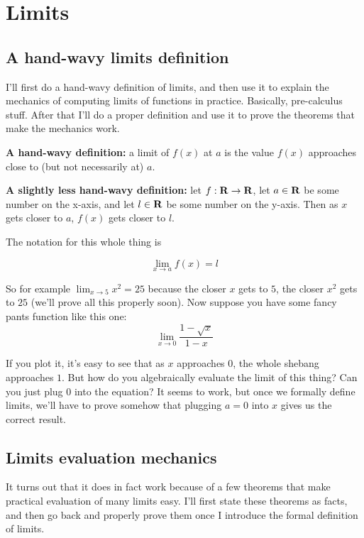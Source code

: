 \section{Limits}

\subsection{A hand-wavy limits definition}

I'll first do a hand-wavy definition of limits, and then use it to
explain the mechanics of computing limits of functions in practice.
Basically, pre-calculus stuff. After that I'll do a proper definition
and use it to prove the theorems that make the mechanics work.

\vs

\textbf{A hand-wavy definition:} a limit of $f(x)$ at $a$ is the value
$f(x)$ approaches close to (but not necessarily at) $a$.

\vs

\textbf{A slightly less hand-wavy definition:} let $f:\mathbf{R}\to\mathbf{R}$, let
$a\in\mathbf{R}$ be some number on the x-axis, and let $l\in\mathbf{R}$ be some number on
the y-axis. Then as $x$ gets closer to $a$, $f(x)$ gets closer to $l$.

\vs

The notation for this whole thing is

\[\lim_{x\to a} f(x)=l\]

So for example $\lim_{x\to5}x^2=25$ because the closer $x$ gets to
$5$, the closer $x^2$ gets to $25$ (we'll prove all this properly
soon). Now suppose you have some fancy pants function like this one:
\begin{equation}
\label{eq:1}
\lim_{x\to 0}\frac{1-\sqrt{x}}{1-x}
\end{equation}

If you plot it, it's easy to see that as $x$ approaches $0$, the whole
shebang approaches $1$. But how do you algebraically evaluate the
limit of this thing? Can you just plug $0$ into the equation? It seems
to work, but once we formally define limits, we'll have to prove
somehow that plugging $a=0$ into $x$ gives us the correct result.

\subsection{Limits evaluation mechanics}

It turns out that it does in fact work because of a few theorems that
make practical evaluation of many limits easy. I'll first state these
theorems as facts, and then go back and properly prove them once I
introduce the formal definition of limits.

